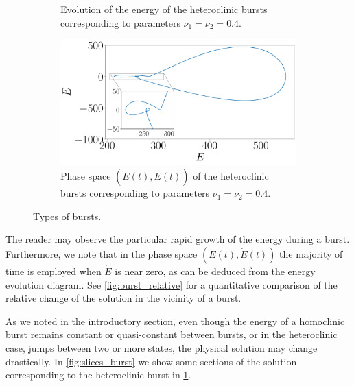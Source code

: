 \documentclass[twoside]{article}
\begin{document}
\begin{figure}[ht]
\begin{subfigure}[ht]{0.435\textwidth}
    \caption{Evolution of the energy of the heteroclinic bursts corresponding to parameters $\nu_1=\nu_2=0.4$.}
    \label{fig:he_c}
  \end{subfigure}\hspace{0.04666\textwidth}
  \begin{subfigure}[ht]{0.435\textwidth}
    \includegraphics[width=\textwidth]{images/hetero_burst_phase.pdf}
    \caption{Phase space $(E(t), \dot{E}(t))$ of the heteroclinic bursts corresponding to parameters $\nu_1=\nu_2=0.4$.}
  \end{subfigure}
  \caption{Types of bursts.}
  \label{fig:burst}
\end{figure}

The reader may observe the particular rapid growth of the energy during a burst. Furthermore, we note that in the phase space $(E(t), \dot{E}(t))$ the majority of time is employed when $\dot{E}$ is near zero, as can be deduced from the energy evolution diagram. See \cref{fig:burst_relative} for a quantitative comparison of the relative change of the solution in the vicinity of a burst.

As we noted in the introductory section, even though the energy of a homoclinic burst remains constant or quasi-constant between bursts, or in the heteroclinic case, jumps between two or more states, the physical solution may change drastically. In \cref{fig:slices_burst} we show some sections of the solution corresponding to the heteroclinic burst in \cref{fig:he_c}.
\end{document}
